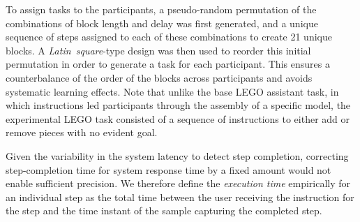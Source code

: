 To assign tasks to the participants, a pseudo-random permutation of the combinations of block length and delay was first generated, and a unique sequence of steps assigned to each of these combinations to create 21 unique blocks.
A \emph{Latin~square}-type design was then used to reorder this initial permutation in order to generate a task for each participant.
This ensures a counterbalance of the order of the blocks across participants and avoids systematic learning effects. 
Note that unlike the base LEGO assistant task, in which instructions led participants through the assembly of a specific model, the experimental LEGO task consisted of a sequence of instructions to either add or remove pieces with no evident goal.




Given the variability in the system latency to detect step completion, correcting step-completion time for system response time by a fixed amount would not enable sufficient precision.
We therefore define the \emph{execution time} empirically for an individual step as the total time between the user receiving the instruction for the step and the time instant of the sample capturing the completed step.


